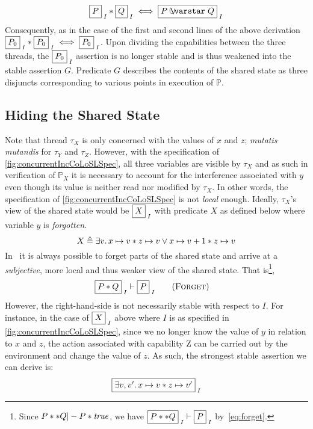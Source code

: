 %
\[
	\shared{P}{I} * \shared{Q}{I} \iff \shared{P \sepish Q}{I}
\]
%
Consequently, as in the case of the first and second lines of the above derivation $\shared{P_0}{I} * \shared{P_0}{I} \iff \shared{P_0}{I}$. Upon dividing the capabilities between the three threads, the $\shared{P_0}{I}$ assertion is no longer stable and is thus weakened into the stable assertion $G$. Predicate $G$ describes the contents of the shared state as three disjuncts corresponding to various points in execution of $\mathbb{P}$. 
%
%
%
\subsection{Hiding the Shared State}\label{subsec:hide}
Note that thread $\tau_X$ is only concerned with the values of $x$ and $z$; \emph{mutatis mutandis} for $\tau_Y$ and $\tau_Z$. However, with the specification of \fig\ref{fig:concurrentIncCoLoSLSpec}, all three variables are visible by $\tau_X$ and as such in verification of $\mathbb{P}_X$ it is necessary to account for the interference associated with $y$ even though its value is neither read nor modified by $\tau_X$. In other words, the specification of \fig\ref{fig:concurrentIncCoLoSLSpec} is not \emph{local} enough. Ideally, $\tau_X$'s view of the shared state would be $\shared{X}{I}$ with predicate $X$ as defined below where variable $y$ is \emph{forgotten}.
%
\[
	X \mathrel{\triangleq} \exists v.\, x \mapsto v * z \mapsto v \lor x \mapsto v+1 * z \mapsto v
\]
%
In \colosl\ it is always possible to forget parts of the shared state
and arrive at a \emph{subjective}, more local and thus weaker view of
the shared state. That is\footnote{Since $P ** Q |- P * \mathit{true}$, we
  have $\shared{P ** Q}{I} \vdash \shared{P}{I}$ by~\eqref{eq:forget}.},
%
\begin{align*}
  \label{eq:forget}
  \shared{P * Q}{I} &\vdash \shared{P}{I}  \tag{\textsc{Forget}}
\end{align*}
%
However, the right-hand-side is not necessarily stable with respect to $I$. For instance, in the case of $\shared{X}{I}$ above where $I$ is as specified in \fig\ref{fig:concurrentIncCoLoSLSpec}, since we no longer know the value of $y$ in relation to $x$ and $z$, the action associated with capability \textsf{Z} can be carried out by the environment and change the value of $z$. As such, the strongest stable assertion we can derive is: 
%
\[
	\shared{\exsts{v, v'}  \cell{x}{v} * \cell{z}{v'}}{I}
\]
%
%
